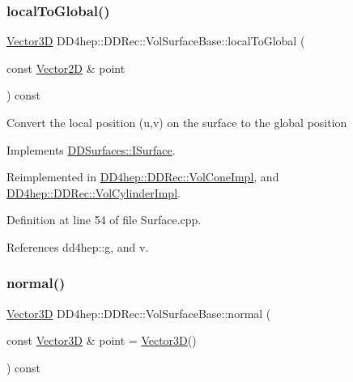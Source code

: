 \subsubsection{\texorpdfstring{local\+To\+Global()}{localToGlobal()}}
{\footnotesize\ttfamily \hyperlink{class_d_d_surfaces_1_1_vector3_d}{Vector3D} D\+D4hep\+::\+D\+D\+Rec\+::\+Vol\+Surface\+Base\+::local\+To\+Global (\begin{DoxyParamCaption}\item[{const \hyperlink{class_d_d_surfaces_1_1_vector2_d}{Vector2D} \&}]{point }\end{DoxyParamCaption}) const\hspace{0.3cm}{\ttfamily [virtual]}}

Convert the local position (u,v) on the surface to the global position 

Implements \hyperlink{class_d_d_surfaces_1_1_i_surface_a39651d79f7969ac7402a6e2cfc37803c}{D\+D\+Surfaces\+::\+I\+Surface}.



Reimplemented in \hyperlink{class_d_d4hep_1_1_d_d_rec_1_1_vol_cone_impl_af32c1efbead53b381287c82e3ce23755}{D\+D4hep\+::\+D\+D\+Rec\+::\+Vol\+Cone\+Impl}, and \hyperlink{class_d_d4hep_1_1_d_d_rec_1_1_vol_cylinder_impl_afea034d9cc2ea238ca37e867b368df60}{D\+D4hep\+::\+D\+D\+Rec\+::\+Vol\+Cylinder\+Impl}.



Definition at line 54 of file Surface.\+cpp.



References dd4hep\+::g, and v.

\hypertarget{class_d_d4hep_1_1_d_d_rec_1_1_vol_surface_base_a247a1503e7265c3a9e4a6a17df2c58e4}{}\label{class_d_d4hep_1_1_d_d_rec_1_1_vol_surface_base_a247a1503e7265c3a9e4a6a17df2c58e4} 
\subsubsection{\texorpdfstring{normal()}{normal()}}
{\footnotesize\ttfamily \hyperlink{class_d_d_surfaces_1_1_vector3_d}{Vector3D} D\+D4hep\+::\+D\+D\+Rec\+::\+Vol\+Surface\+Base\+::normal (\begin{DoxyParamCaption}\item[{const \hyperlink{class_d_d_surfaces_1_1_vector3_d}{Vector3D} \&}]{point = {\ttfamily \hyperlink{class_d_d_surfaces_1_1_vector3_d}{Vector3D}()} }\end{DoxyParamCaption}) const\hspace{0.3cm}{\ttfamily [virtual]}}



